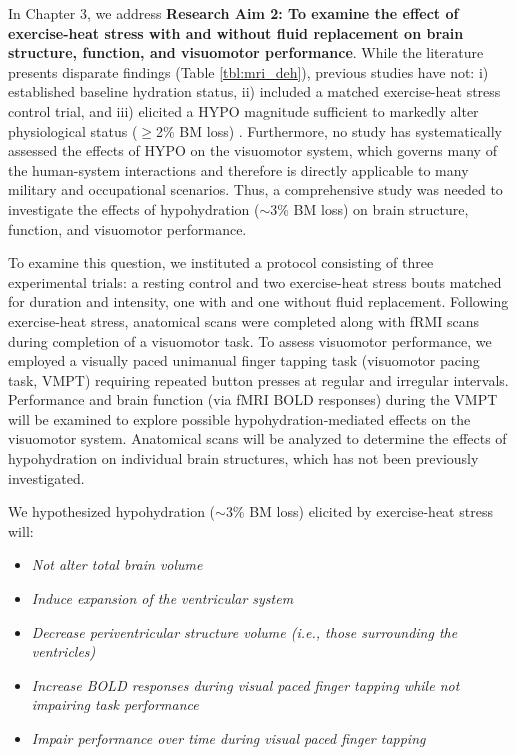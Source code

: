 In Chapter 3, we address \textbf{Research Aim 2: To examine the effect of exercise-heat stress with and without fluid replacement on brain structure, function, and visuomotor performance}. While the literature presents disparate findings (Table \ref{tbl:mri_deh}), previous studies have not: i) established baseline hydration status, ii) included a matched exercise-heat stress control trial, and iii) elicited a HYPO magnitude sufficient to markedly alter physiological status (${\ge}$2\% BM loss) \cite{cheuvront_biological_2010}. Furthermore, no study has systematically assessed the effects of HYPO on the visuomotor system, which governs many of the human-system interactions \cite{buhusi_what_2005} and therefore is directly applicable to many military and occupational scenarios. Thus, a comprehensive study was needed to investigate the effects of hypohydration (${\sim}$3\% BM loss) on brain structure, function, and visuomotor performance. 

To examine this question, we instituted a protocol consisting of three experimental trials: a resting control and two exercise-heat stress bouts matched for duration and intensity, one with and one without fluid replacement. Following exercise-heat stress, anatomical scans were completed along with fRMI scans during completion of a visuomotor task. To assess visuomotor performance, we employed a visually paced unimanual finger tapping task (visuomotor pacing task, VMPT) requiring repeated button presses at regular and irregular intervals. Performance and brain function (via fMRI BOLD responses) during the VMPT will be examined to explore possible hypohydration-mediated effects on the visuomotor system. Anatomical scans will be analyzed to determine the effects of hypohydration on individual brain structures, which has not been previously investigated.

We hypothesized hypohydration (${\sim}$3\% BM loss) elicited by exercise-heat stress will:
	\begin{itemize}
		\item \textit{Not alter total brain volume}
		\item \textit{Induce expansion of the ventricular system}
		\item \textit{Decrease periventricular structure volume (i.e., those surrounding the ventricles)} 
		\item \textit{Increase BOLD responses during visual paced finger tapping while not impairing task performance}
		\item \textit{Impair performance over time during visual paced finger tapping}
	\end{itemize}

